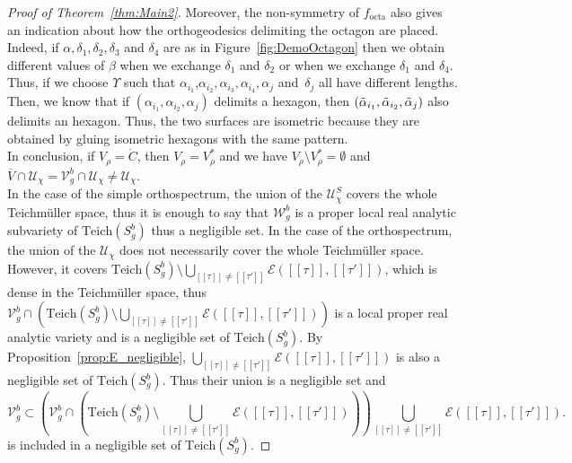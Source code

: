 \documentclass[a4paper,12pt]{article}
\theoremstyle{definition}
\theoremstyle{remark}
\begin{document}
\begin{proof}[Proof of Theorem~\ref{thm:Main2}]
    Moreover, the non-symmetry of $f_{\mathrm{octa}}$ also gives an indication about how the orthogeodesics delimiting the octagon are placed. Indeed, if $\alpha, \delta_1, \delta_2, \delta_3$ and $\delta_4$ are as in Figure~\ref{fig:DemoOctagon} then we obtain different values of $\beta$ when we exchange $\delta_1$ and $\delta_2$ or when we exchange $\delta_1$ and $\delta_4$.  
    Thus, if we choose $\Upsilon$ such that $\alpha_{i_1}$,$\alpha_{i_2},\alpha_{i_3},\alpha_{i_4},\alpha_{j}$ and~$\delta_j$ all have different lengths. Then, we know that if $(\alpha_{i_1}, \alpha_{i_2},\alpha_j)$ delimits a hexagon, then $(\Tilde{\alpha}_{i_1}, \Tilde{\alpha}_{i_2},\Tilde{\alpha}_j)$ also delimits an hexagon. Thus, the two surfaces are isometric because they are obtained by gluing isometric hexagons with the same pattern. \\
    In conclusion, if $V_{\rho}=\mathring{C}$, then $V_{\rho}=V_{\rho}^*$ and we have $V_{\rho} \setminus V_{\rho}^* = \emptyset$ and $\overline{V} \cap \mathcal{U}_\chi = \mathcal{V}_g^b \cap \mathcal{U}_\chi \neq \mathcal{U}_\chi$. \\
    
    In the case of the simple orthospectrum, the union of the $\mathcal{U}_\chi^S$ covers the whole Teichmüller space, thus it is enough to say that $\mathcal{W}_g^b$ is a proper local real analytic subvariety of $\mathrm{Teich}(S_g^b)$ thus a negligible set. In the case of the orthospectrum, the union of the $\mathcal{U}_\chi$ does not necessarily cover the whole Teichmüller space. However, it covers $\mathrm{Teich}(S_g^b) \setminus \bigcup_{[[\tau]]\neq [[\tau']]} \mathcal{E}([[\tau]],[[\tau']])$, which is dense in the Teichmüller space, thus $\mathcal{V}_g^b \cap ( \mathrm{Teich}(S_g^b) \setminus \bigcup_{[[\tau]]\neq [[\tau']]} \mathcal{E}([[\tau]],[[\tau']]) )$ is a local proper real analytic variety and is a negligible set of $\mathrm{Teich}(S_g^b)$. By Proposition~\ref{prop:E_negligible}, $\bigcup_{[[\tau]]\neq [[\tau']]} \mathcal{E}([[\tau]],[[\tau']])$ is also a negligible set of $\mathrm{Teich}(S_g^b)$. Thus their union is a negligible set and
    \[
        \mathcal{V}_g^b \subset \left(  \mathcal{V}_g^b \cap ( \mathrm{Teich}(S_g^b) \setminus \bigcup_{[[\tau]]\neq [[\tau']]} \mathcal{E}([[\tau]],[[\tau']]) )  \right) \bigcup_{[[\tau]]\neq [[\tau']]} \mathcal{E}([[\tau]],[[\tau']]).
    \]
    is included in a negligible set of $\mathrm{Teich}(S_g^b)$.
\end{proof}
\end{document}
